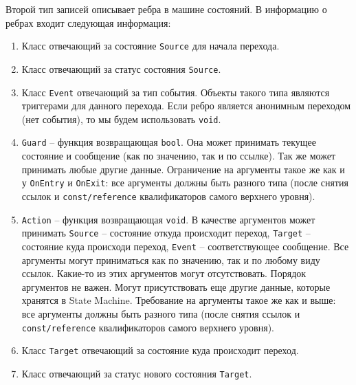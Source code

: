 \documentclass{article}
\begin{document}
{Второй тип записей описывает ребра в машине состояний.
В информацию о ребрах входит следующая информация:
\begin{enumerate}
\item Класс отвечающий за состояние \verb"Source" для начала перехода.

\item Класс отвечающий за статус состояния \verb"Source".

\item Класс \verb"Event" отвечающий за тип события.
Объекты такого типа являются триггерами для данного перехода.
Если ребро является анонимным переходом (нет события), то мы будем использовать \verb"void".

\item \verb"Guard" -- функция возвращающая \verb"bool".
Она может принимать текущее состояние и сообщение (как по значению, так и по ссылке).
Так же может принимать любые другие данные.
Ограничение на аргументы такое же как и у \verb"OnEntry" и \verb"OnExit": все аргументы должны быть разного типа (после снятия ссылок и \verb"const/reference" квалификаторов самого верхнего уровня).

\item \verb"Action" -- функция возвращающая \verb"void".
В качестве аргументов может принимать \verb"Source" -- состояние откуда происходит переход, \verb"Target" -- состояние куда происходи переход, \verb"Event" -- соответствующее сообщение.
Все аргументы могут приниматься как по значению, так и по любому виду ссылок.
Какие-то из этих аргументов могут отсутствовать.
Порядок аргументов не важен.
Могут присутствовать еще другие данные, которые хранятся в State Machine.
Требование на аргументы такое же как и выше: все аргументы должны быть разного типа (после снятия ссылок и \verb"const/reference" квалификаторов самого верхнего уровня).

\item Класс \verb"Target" отвечающий за состояние куда происходит переход.

\item Класс отвечающий за статус нового состояния \verb"Target".
\end{enumerate}

}
\end{document}
